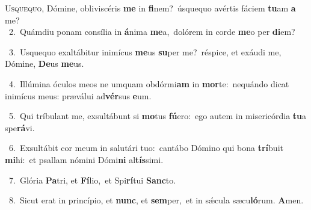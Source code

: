 \lettrine{\initial\textcolor{\initialcolor}{U}}{squequo,} Dómine, obliviscéris \textbf{me} in \textbf{fi}\-nem?~\star úsquequo avértis fáciem \textbf{tu}\-am \textbf{a} me?\\
{\numbfont\textcolor{\numbcolor}{~2.}}~Quámdiu ponam consília in \textbf{á}\-nima \textbf{me}\-a,~\star dolórem in corde \textbf{me}\-o per \textbf{di}\-em?\par
{\numbfont\textcolor{\numbcolor}{~3.}}~Usquequo exaltábitur inimícus \textbf{me}\-us \textbf{su}\-per me?~\star réspice, et exáudi me, Dómine, \textbf{De}\-us \textbf{me}\-us.\par
{\numbfont\textcolor{\numbcolor}{~4.}}~Illúmina óculos meos ne umquam obdórmi\textbf{am} in \textbf{mor}\-te:~\star nequándo dicat inimícus meus: præválui ad\-\textbf{vér}\-sus \textbf{e}\-um.\par
{\numbfont\textcolor{\numbcolor}{~5.}}~Qui tríbulant me, exsultábunt si \textbf{mo}\-tus \textbf{fú}\-ero:~\star ego autem in misericórdia \textbf{tu}\-a spe\-\textbf{rá}\-vi.\par
{\numbfont\textcolor{\numbcolor}{~6.}}~Exsultábit cor meum in salutári tuo:~\dagger cantábo Dómino qui bona \textbf{trí}\-buit \textbf{mi}\-hi:~\star et psallam nómini Dómi\textbf{ni} al\-\textbf{tís}\-simi.\par
{\numbfont\textcolor{\numbcolor}{~7.}}~Glória \textbf{Pa}\-tri, et \textbf{Fí}\-lio,~\star et Spi\-\textbf{rí}\-tui \textbf{Sanc}\-to.\par
{\numbfont\textcolor{\numbcolor}{~8.}}~Sicut erat in princípio, et \textbf{nunc}\-, et \textbf{sem}\-per,~\star et in sǽcula sæcu\-\textbf{ló}\-rum. \textbf{A}\-men.\par
